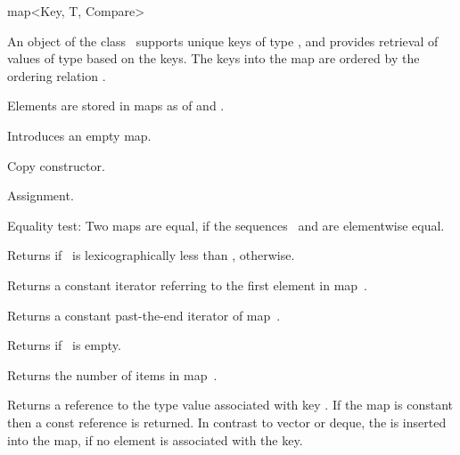 
\ccHtmlNoClassLinks
\begin{ccClassTemplate} {map<Key, T, Compare>}


\ccDefinition
An object of the class \ccClassTemplateName\ supports unique keys of 
type , and provides retrieval of values of type 
based on the keys. The keys into the map are ordered by the ordering
relation .

Elements are stored in maps as  of  and 
.


\ccHtmlLinksOff
{}
\ccHtmlLinksOn

\ccTypes
{}


\ccCreation
{}


             {Introduces an empty map.}

 	    {Copy constructor.}

\ccOperations


        {Assignment.}

{Equality test: Two maps are equal, if the sequences \ccVar\ and 
 are elementwise equal.}


{Returns  if \ccVar\ is lexicographically less than ,
  otherwise.}

       {Returns a constant iterator referring to the first element in
        map~\ccVar.}

       {Returns a constant past-the-end iterator of map~\ccVar.}

	{Returns  if \ccVar\ is empty.}

	{Returns the number of items in map~\ccVar.}

{Returns a reference to the type  value associated with
key . If the map is constant then a const reference is 
returned. In contrast to vector or deque, the 
is inserted into the map, if no element is associated with the key.}


\end{ccClassTemplate}
